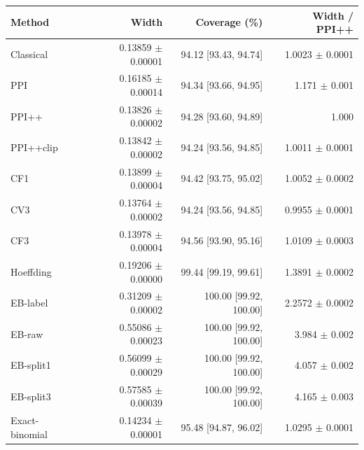 \small
\begin{tabular}{lrrr}
\toprule
Method & Width & Coverage (\%) & Width / PPI++ \\
\midrule
Classical & 0.13859 $\pm$ 0.00001 & 94.12 [93.43, 94.74] & 1.0023 $\pm$ 0.0001 \\
PPI & 0.16185 $\pm$ 0.00014 & 94.34 [93.66, 94.95] & 1.171 $\pm$ 0.001 \\
PPI++ & 0.13826 $\pm$ 0.00002 & 94.28 [93.60, 94.89] & 1.000 \\
PPI++clip & 0.13842 $\pm$ 0.00002 & 94.24 [93.56, 94.85] & 1.0011 $\pm$ 0.0001 \\
CF1 & 0.13899 $\pm$ 0.00004 & 94.42 [93.75, 95.02] & 1.0052 $\pm$ 0.0002 \\
CV3 & 0.13764 $\pm$ 0.00002 & 94.24 [93.56, 94.85] & 0.9955 $\pm$ 0.0001 \\
CF3 & 0.13978 $\pm$ 0.00004 & 94.56 [93.90, 95.16] & 1.0109 $\pm$ 0.0003 \\
Hoeffding & 0.19206 $\pm$ 0.00000 & 99.44 [99.19, 99.61] & 1.3891 $\pm$ 0.0002 \\
EB-label & 0.31209 $\pm$ 0.00002 & 100.00 [99.92, 100.00] & 2.2572 $\pm$ 0.0002 \\
EB-raw & 0.55086 $\pm$ 0.00023 & 100.00 [99.92, 100.00] & 3.984 $\pm$ 0.002 \\
EB-split1 & 0.56099 $\pm$ 0.00029 & 100.00 [99.92, 100.00] & 4.057 $\pm$ 0.002 \\
EB-split3 & 0.57585 $\pm$ 0.00039 & 100.00 [99.92, 100.00] & 4.165 $\pm$ 0.003 \\
Exact-binomial & 0.14234 $\pm$ 0.00001 & 95.48 [94.87, 96.02] & 1.0295 $\pm$ 0.0001 \\
\bottomrule
\end{tabular}
